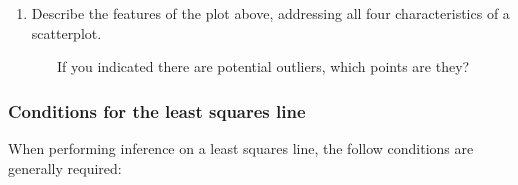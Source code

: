 \documentclass[
]{report}
\providecommand{\tightlist}{%
  \setlength{\itemsep}{0pt}\setlength{\parskip}{0pt}}
\begin{document}
\vspace{2in}

\begin{enumerate}
\def\labelenumi{\arabic{enumi}.}
\setcounter{enumi}{3}
\tightlist
\item
  Describe the features of the plot above, addressing all four characteristics of a scatterplot.
\end{enumerate}

\vspace{1in}

~~~~~~~If you indicated there are potential outliers, which points are they?

\vspace{0.5in}

\hypertarget{conditions-for-the-least-squares-line}{%
\subsubsection*{Conditions for the least squares line}\label{conditions-for-the-least-squares-line}}

When performing inference on a least squares line, the follow conditions are generally required:
\end{document}
